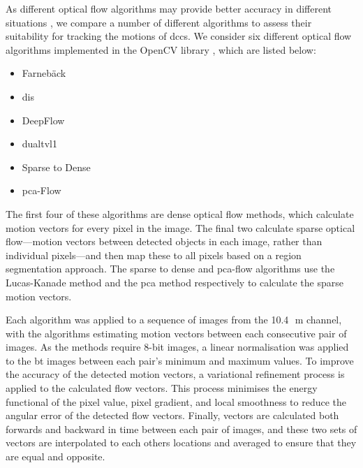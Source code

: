 As different optical flow algorithms may provide better accuracy in different situations \citep{baker_database_2011}, we compare a number of different algorithms to assess their suitability for tracking the motions of \acrshort{dcc}s.
We consider six different optical flow algorithms implemented in the OpenCV library \citep{opencv_library}, which are listed below:

\begin{itemize}
    \item Farnebäck \citep{farneback_two-frame_2003}
    \item \acrfull{dis} \citep{kroeger_fast_2016}
    \item DeepFlow \citep{weinzaepfel_deepflow_2013}
    \item \acrfull{dualtvl1} \citep{zach_duality_2007, perez_tv-l1_2013}
    \item Sparse to Dense \citep{bouguet_pyramidal_1999}
    \item \acrfull{pca}-Flow \citep{wulff_efficient_2015}
\end{itemize}

The first four of these algorithms are dense optical flow methods, which calculate motion vectors for every pixel in the image.
The final two calculate sparse optical flow---motion vectors between detected objects in each image, rather than individual pixels---and then map these to all pixels based on a region segmentation approach.
The sparse to dense and \acrshort{pca}-flow algorithms use the Lucas-Kanade method \citep{lucas_iterative_1981} and the \acrshort{pca} method respectively to calculate the sparse motion vectors.

Each algorithm was applied to a sequence of images from the 10.4\,\unit{\mu m} channel, with the algorithms estimating motion vectors between each consecutive pair of images.
As the methods require 8-bit images, a linear normalisation was applied to the \acrshort{bt} images between each pair's minimum and maximum values.
To improve the accuracy of the detected motion vectors, a variational refinement process \citep{brox_high_2004} is applied to the calculated flow vectors.
This process minimises the energy functional of the pixel value, pixel gradient, and local smoothness to reduce the angular error of the detected flow vectors.
Finally, vectors are calculated both forwards and backward in time between each pair of images, and these two sets of vectors are interpolated to each others locations and averaged to ensure that they are equal and opposite.

